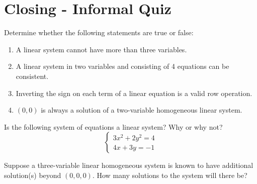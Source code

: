 \documentclass[11pt]{exam}
\begin{document}
\section{Closing - Informal Quiz}
    \begin{questions}
        \item Determine whether the following statements are true or false:
        \begin{enumerate}
            \item A linear system cannot have more than three variables.
            \item A linear system in two variables and consisting of 4 equations can be consistent.
            \item Inverting the sign on each term of a linear equation is a valid row operation.
            \item $(0,0)$ is always a solution of a two-variable homogeneous linear system.
        \end{enumerate}
        
        \item Is the following system of equations a linear system? Why or why not?
        $$\begin{cases}
            3x^2 + 2y^2 = 4 \\
            4x + 3y = -1
        \end{cases}$$

        \item Suppose a three-variable linear homogeneous system is known to have additional solution(s) beyond $(0,0,0)$. How
        many solutions to the system will there be?
    \end{questions}
\end{document}
